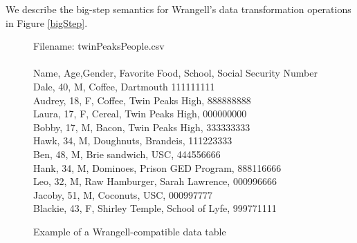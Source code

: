 \documentclass[preprint,nocopyrightspace]{sig-alternate}
\begin{document}
\begin{comment}
TODO: add stuff about doing transformations on data
\end{comment}

We describe the big-step semantics for Wrangell's data transformation operations in Figure \ref{bigStep}.

\onecolumn

\begin{figure}
\caption{Example of a Wrangell-compatible data table}
Filename: twinPeaksPeople.csv
\\\\
Name,   Age,Gender,	Favorite Food,	School,				Social Security Number \\
Dale,   40,	M,		Coffee,			Dartmouth			111111111\\
Audrey, 18,	F,		Coffee,			Twin Peaks High,	888888888\\
Laura,  17,	F,		Cereal,			Twin Peaks High,	000000000\\
Bobby,  17,	M,		Bacon,			Twin Peaks High,	333333333\\
Hawk,   34,	M,		Doughnuts,		Brandeis,			111223333\\
Ben,    48,	M,		Brie sandwich,	USC,				444556666\\
Hank,   34,	M,		Dominoes,		Prison GED Program,	888116666\\
Leo,    32,	M,		Raw Hamburger,	Sarah Lawrence,		000996666\\
Jacoby,  51, M,		Coconuts,		USC,				000997777\\
Blackie,	43, F,	Shirley Temple,	School of Lyfe,		999771111\\	
\label{exampleTable}	
\end{figure} 
\end{document}
